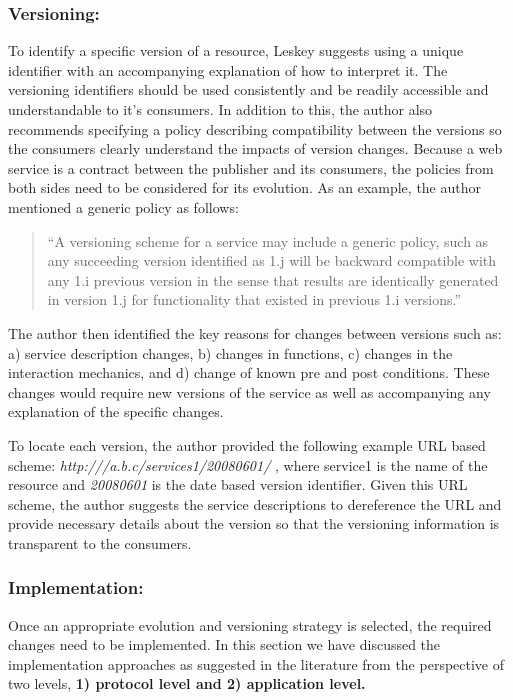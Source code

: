 \documentclass[runningheads,a4paper]{llncs}
\begin{document}
\subsubsection{Versioning:}
To identify a specific version of a resource, Leskey suggests using a unique identifier with an accompanying explanation of how to interpret it. The versioning identifiers should be used consistently and be readily accessible and understandable to it’s consumers. In addition to this, the author also recommends specifying a policy describing compatibility between the versions so the consumers clearly understand the impacts of version changes. Because a web service is a contract between the publisher and its consumers, the policies from both sides need to be considered for its evolution. As an example, the author mentioned a generic policy as follows:

\begin{quote}
``A versioning scheme for a service may include a generic policy, such as any succeeding version identified as 1.j will be backward compatible with any 1.i previous version in the sense that results are identically generated in version 1.j for functionality that existed in previous 1.i versions.''
\end{quote}

The author then identified the key reasons for changes between versions such as: a) service description changes, b) changes in functions, c) changes in the interaction mechanics, and d) change of known pre and post conditions. These changes would require new versions of the service as well as accompanying any explanation of the specific changes.

To locate each version, the author provided the following example URL based scheme: \emph{http:///a.b.c/services1/20080601/} , where service1 is the name of the resource and \emph{20080601} is the date based version identifier. Given this URL scheme, the author suggests the service descriptions to dereference the URL and provide necessary details about the version so that the versioning information is transparent to the consumers.

\subsubsection{Implementation:}
Once an appropriate evolution and versioning strategy is selected, the required changes need to be implemented. In this section we have discussed the implementation approaches as suggested in the literature from the perspective of two levels, \textbf{1) protocol level and 2) application level.}
\end{document}
